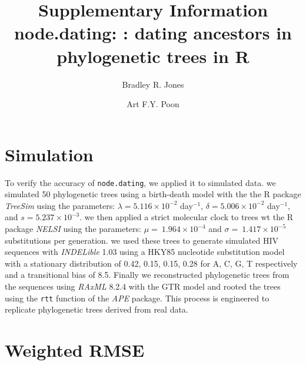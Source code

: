 \documentclass[12pt]{article}
\newcommand{\code}[1]{{\tt #1}}
\begin{document}
\title{Supplementary Information \\ node.dating: : dating ancestors in phylogenetic trees in R}

\author[1,2,*]{Bradley R. Jones}
\author[2,3]{Art F.Y. Poon}

\date{}

\maketitle

\section{Simulation} \label{sec:sim}
To verify the accuracy of \code{node.dating}, we applied it to simulated data.
we simulated 50 phylogenetic trees using a birth-death model with the the R package \emph{TreeSim} \citep{TreeSim} using the parameters: $\lambda = 5.116 \times 10^{-2}$ day$^{-1}$, $\delta = 5.006 \times 10^{-2}$ day$^{-1}$, and $s = 5.237 \times 10^{-3}$.
we then applied a strict molecular clock to trees wt the R package \emph{NELSI} \citep{NELSI} using the parameters: $\mu = \ 1.964\times 10^{-4}$ and $\sigma = \ 1.417\times 10^{-5}$ substitutions per generation.
we used these trees to generate simulated HIV sequences with \emph{INDELible} 1.03 \citep{Indelible09} using a HKY85 nucleotide substitution model \citep{HKY85} with a stationary distribution of 0.42, 0.15, 0.15, 0.28 for A, C, G, T respectively and a transitional bias of 8.5.
Finally we reconstructed phylogenetic trees from the sequences using \emph{RAxML} 8.2.4 \citep{Raxml14} with the GTR model and rooted the trees using the \code{rtt} function of the \emph{APE} package.
This process is engineered to replicate phylogenetic trees derived from real data.

\section{Weighted RMSE} \label{sec:rmse}
\end{document}
